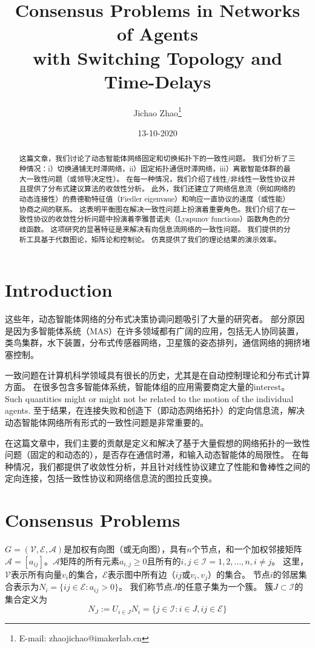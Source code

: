 \documentclass{article}
\title{Consensus Problems in Networks of Agents\\ with Switching Topology and Time-Delays}
\author{ Jichao Zhao\thanks{E-mail: zhaojichao@imakerlab.cn}}
\date{13-10-2020}
\begin{document}
\maketitle
\tableofcontents


\begin{abstract}
这篇文章，我们讨论了动态智能体网络固定和切换拓扑下的一致性问题。
我们分析了三种情况：i）切换通铺无时滞网络，ii）固定拓扑通信时滞网络，iii）离散智能体群的最大一致性问题（或领导决定性）。
在每一种情况，我们介绍了线性/非线性一致性协议并且提供了分布式建议算法的收敛性分析。
此外，我们还建立了网络信息流（例如网络的动态连接性）的费德勒特征值（Fiedler eigenvaue）和响应一直协议的速度（或性能）协商之间的联系。
这表明平衡图在解决一致性问题上扮演着重要角色。我们介绍了在一致性协议的收敛性分析问题中扮演着李雅普诺夫（Lyapunov functions）函数角色的分歧函数。
这项研究的显著特征是来解决有向信息流网络的一致性问题。
我们提供的分析工具基于代数图论，矩阵论和控制论。
仿真提供了我们的理论结果的演示效率。
\end{abstract}

\section{Introduction}
这些年，动态智能体网络的分布式决策协调问题吸引了大量的研究者。
部分原因是因为多智能体系统（MAS）在许多领域都有广阔的应用，包括无人协同装置，类鸟集群，水下装置，分布式传感器网络，卫星簇的姿态排列，通信网络的拥挤堵塞控制。


一致问题在计算机科学领域具有很长的历史，尤其是在自动控制理论和分布式计算方面。
在很多包含多智能体系统，智能体组的应用需要商定大量的interest。
Such quantities might or might not be related to the motion of the individual agents. 
至于结果，在连接失败和创造下（即动态网络拓扑）的定向信息流，解决动态智能体网络所有形式的一致性问题是非常重要的。


在这篇文章中，我们主要的贡献是定义和解决了基于大量假想的网络拓扑的一致性问题（固定的和动态的），是否存在通信时滞，和输入动态智能体的局限性。
在每种情况，我们都提供了收敛性分析，并且针对线性协议建立了性能和鲁棒性之间的定向连接，包括一致性协议和网络信息流的图拉氏变换。

\section{Consensus Problems}
$G=(\mathcal{V},\mathcal{E},\mathcal{A})$是加权有向图（或无向图），具有$n$个节点，和一个加权邻接矩阵$\mathcal{A}=[a_{ij}]$。$\mathcal{A}$矩阵的所有元素$a_{i,j} \ge 0$且所有的$i,j \in \mathcal{I}={1,2,…,n},i \ne j$。
这里，$\mathcal{V}$表示所有向量$v_i$的集合，$\mathcal{E}$表示图中所有边（$ij$或$v_i,v_j$）的集合。
节点$i$的邻居集合表示为$N_i=\{ij\in \mathcal{E}:a_{ij}>0\}$。
我们称节点$J$的任意子集为一个簇。
簇$J\subset \mathcal{I}$的集合定义为
\begin{equation}
    N_J:=U_{i\in J}N_i=\{j\in \mathcal{I}:i\in J, ij\in \mathcal{E}\}
\end{equation}
\end{document}
